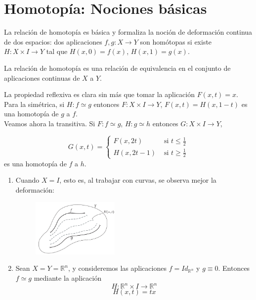 \chapter{Homotopía: Nociones básicas}\label{sec:homotbas}
La relación de homotopía es básica y formaliza la noción de deformación continua de dos espacios: dos aplicaciones $f, g : X\longrightarrow Y$ son homótopas si existe $H : X \times I \longrightarrow Y$ tal que $H(x, 0) = f(x)$, $H(x, 1) = g(x)$. 
\begin{prop}
La relación de homotopía es una relación de equivalencia en el conjunto de aplicaciones continuas de $X$ a $Y$.
\end{prop}
\begin{demo} 
La propiedad reflexiva es clara sin más que tomar la aplicación $F(x,t) = x$.\\
Para la simétrica, si $H : f \simeq g$ entonces $F : X \times I \longrightarrow Y$, $F(x, t) = H(x, 1-t)$ es una homotopía de $g$ a $f$.\\
Veamos ahora la transitiva. Si $F : f \simeq g$, $H : g \simeq h$ entonces $G : X \times I \longrightarrow Y$,

$$G(x, t) = 
\begin{cases}
	F(x, 2t) 	& 	\text{ si } t \leq \frac{1}{2}\\
	H(x, 2t - 1)& 	\text{ si } t \geq \frac{1}{2}
\end{cases}$$ 
es una homotopía de $f$ a $h$.
\end{demo}
\begin{ejems}
\begin{enumerate}
\item \label{ej1:1} Cuando $X = I$, esto es, al trabajar con curvas, se observa mejor la deformación:
\begin{figure}[h]
\centering
\includegraphics[width=0.4\textwidth]{images/homotcamin.pdf}
\end{figure}
\item \label{ej1:2} Sean $X = Y = \mathbb{R}^n$, y consideremos las aplicaciones $f = Id_{\mathbb{R}^n}$ y $g \equiv 0$. Entonces $f \simeq g$ mediante la aplicación
$$H : \mathbb{R}^n \times I \longrightarrow \mathbb{R}^n$$ $$H(x, t) = tx$$
\end{enumerate}
\end{ejems}
